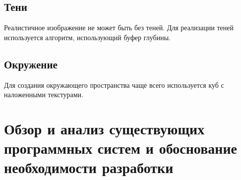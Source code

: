 \subsection{Тени}

Реалистичное изображение не может быть без теней. Для реализации теней используется алгоритм, использующий
буфер глубины.

\subsection{Окружение}

Для создания окружающего пространства чаще всего используется куб с наложенными текстурами.

\section{Обзор и анализ существующих программных систем и обоснование необходимости разработки}
